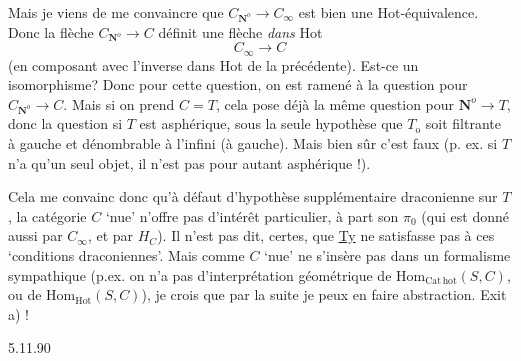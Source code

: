 \documentclass[11pt]{article}
\newcommand{\printedpage}[1]{\marginpar{\footnotesize p.~#1}}
\newcommand{\msp}[1]{\marginpar{\vspace*{10pt}\footnotesize [#1]}}
\newcommand{\CNo}{C_{\mathbf{N}^{o}}}
\begin{document}
Mais je viens de me convaincre que $\CNo \longrightarrow C_{\infty}$ est bien une Hot-équivalence. Donc la flèche $\CNo \longrightarrow C$ définit une flèche \textit{dans} Hot
\[
C_{\infty} \longrightarrow C
\]
(en composant avec l'inverse dans Hot de la précédente). Est-ce un isomorphisme? Donc pour cette question, on est ramené à la question pour $\CNo \longrightarrow C$. Mais si on prend $C = T$, cela pose déjà la même question pour $\mathbf{N}^{o} \longrightarrow T$, donc la question si $T$ est asphérique, sous la seule hypothèse que $T_{\mathrm{o}}$ soit filtrante à gauche et dénombrable à l'infini (à gauche). Mais bien sûr c'est faux (p. ex. si $T$ n'a qu'un seul objet, il n'est pas pour autant asphérique !).

Cela me convainc donc qu'à défaut
\printedpage{70}
\msp{page 110}
d'hypothèse supplémentaire draconienne sur $T$, la catégorie $C$ `nue' n'offre pas d'intérêt particulier, à part son $\pi_{0}$ (qui est donné aussi par $C_{\infty}$, et par $H_{C}$). Il n'est pas dit, certes, que \underline{Ty} ne satisfasse pas à ces `conditions draconiennes'. Mais comme $C$ `nue' ne s'insère pas dans un formalisme sympathique (p.ex. on n'a pas d'interprétation géométrique de $\mathrm{Hom}_{\mathrm{Cat\,hot}}(S,C)$, ou de $\mathrm{Hom}_{\mathrm{Hot}}(S,C)$), je crois que par la suite je peux en faire abstraction. Exit a) !

\begin{flushright}
{\footnotesize 5.11.90}
\end{flushright}
\end{document}
